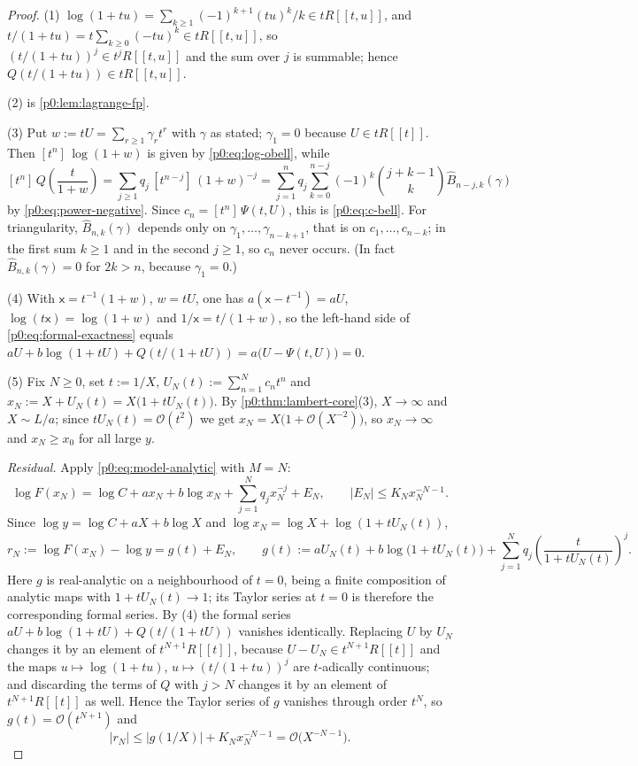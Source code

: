 \documentclass[11pt,a4paper,oneside]{book}
\theoremstyle{plain}
\theoremstyle{definition}
\theoremstyle{remark}
\newcommand{\Coef}[1]{[#1]\,}
\newcommand{\bigO}{\mathcal{O}}
\newcommand{\OB}{\widehat{B}}
\begin{document}
\begin{proof}
(1) $\log(1+tu)=\sum_{k\ge1}(-1)^{k+1}(tu)^k/k\in tR[[t,u]]$, and
$t/(1+tu)=t\sum_{k\ge0}(-tu)^k\in tR[[t,u]]$, so
$(t/(1+tu))^j\in t^jR[[t,u]]$ and the sum over $j$ is summable; hence
$Q(t/(1+tu))\in tR[[t,u]]$.

(2) is \cref{p0:lem:lagrange-fp}.

(3) Put $w:=tU=\sum_{r\ge1}\gamma_rt^r$ with $\gamma$ as stated; $\gamma_1=0$
because $U\in tR[[t]]$.  Then $\Coef{t^n}\log(1+w)$ is given by
\eqref{p0:eq:log-obell}, while
\[
 \Coef{t^n}Q\!\left(\frac t{1+w}\right)
 =\sum_{j\ge1}q_j\,\Coef{t^{n-j}}(1+w)^{-j}
 =\sum_{j=1}^{n}q_j\sum_{k=0}^{n-j}(-1)^k\binom{j+k-1}{k}\OB_{n-j,k}(\gamma)
\]
by \eqref{p0:eq:power-negative}.  Since $c_n=\Coef{t^n}\Psi(t,U)$, this is
\eqref{p0:eq:c-bell}.  For triangularity, $\OB_{n,k}(\gamma)$ depends only on
$\gamma_1,\dots,\gamma_{n-k+1}$, that is on $c_1,\dots,c_{n-k}$; in the first
sum $k\ge1$ and in the second $j\ge1$, so $c_n$ never occurs.  (In fact
$\OB_{n,k}(\gamma)=0$ for $2k>n$, because $\gamma_1=0$.)

(4) With $\mathsf x=t^{-1}(1+w)$, $w=tU$, one has
$a(\mathsf x-t^{-1})=aU$, $\log(t\mathsf x)=\log(1+w)$ and
$1/\mathsf x=t/(1+w)$, so the left-hand side of
\eqref{p0:eq:formal-exactness} equals
$aU+b\log(1+tU)+Q(t/(1+tU))=a\bigl(U-\Psi(t,U)\bigr)=0$.

(5) Fix $N\ge0$, set $t:=1/X$, $U_N(t):=\sum_{n=1}^{N}c_nt^n$ and
$x_N:=X+U_N(t)=X\bigl(1+tU_N(t)\bigr)$.  By
\cref{p0:thm:lambert-core}(3), $X\to\infty$ and $X\sim L/a$; since
$tU_N(t)=\bigO(t^2)$ we get $x_N=X\bigl(1+\bigO(X^{-2})\bigr)$, so
$x_N\to\infty$ and $x_N\ge x_0$ for all large $y$.

\emph{Residual.}  Apply \eqref{p0:eq:model-analytic} with $M=N$:
\[
 \log F(x_N)=\log C+ax_N+b\log x_N+\sum_{j=1}^{N}q_jx_N^{-j}+E_N,
 \qquad |E_N|\le K_Nx_N^{-N-1}.
\]
Since $\log y=\log C+aX+b\log X$ and $\log x_N=\log X+\log(1+tU_N(t))$,
\[
 r_N:=\log F(x_N)-\log y=g(t)+E_N,
 \qquad
 g(t):=aU_N(t)+b\log\bigl(1+tU_N(t)\bigr)
   +\sum_{j=1}^{N}q_j\left(\frac{t}{1+tU_N(t)}\right)^{j}.
\]
Here $g$ is real-analytic on a neighbourhood of $t=0$, being a finite
composition of analytic maps with $1+tU_N(t)\to1$; its Taylor series at $t=0$
is therefore the corresponding formal series.  By (4) the formal series
$aU+b\log(1+tU)+Q(t/(1+tU))$ vanishes identically.  Replacing $U$ by $U_N$
changes it by an element of $t^{N+1}R[[t]]$, because $U-U_N\in t^{N+1}R[[t]]$
and the maps $u\mapsto\log(1+tu)$, $u\mapsto(t/(1+tu))^j$ are $t$-adically
continuous; and discarding the terms of $Q$ with $j>N$ changes it by an element
of $t^{N+1}R[[t]]$ as well.  Hence the Taylor series of $g$ vanishes through
order $t^{N}$, so $g(t)=\bigO(t^{N+1})$ and
\[
 |r_N|\le\bigl|g(1/X)\bigr|+K_Nx_N^{-N-1}=\bigO\bigl(X^{-N-1}\bigr).
\]


\end{proof}
\end{document}
